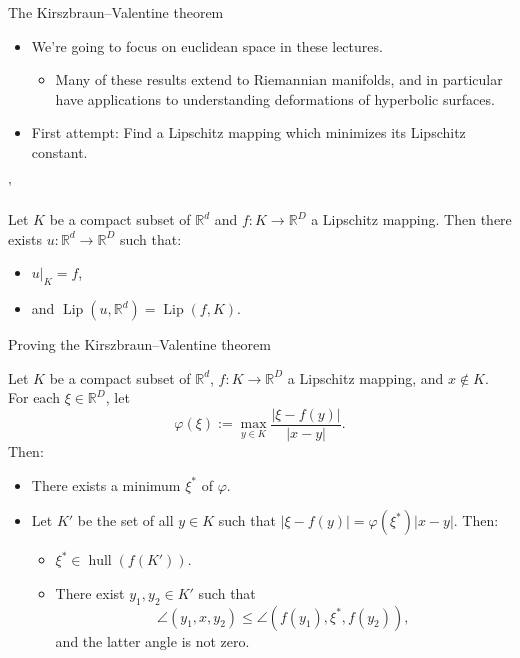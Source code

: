 \documentclass[10pt]{beamer}
\newcommand{\RR}{\mathbb{R}}
\DeclareMathOperator{\Lip}{Lip}
\DeclareMathOperator{\hull}{hull}
\begin{document}
\begin{frame}{The Kirszbraun--Valentine theorem}
\begin{itemize}
\item We're going to focus on euclidean space in these lectures.
\begin{itemize}
\item Many of these results extend to Riemannian manifolds, and in particular have applications to understanding deformations of hyperbolic surfaces. 
\end{itemize}
\item First attempt: Find a Lipschitz mapping which minimizes its Lipschitz constant. 
\end{itemize}
'
\begin{theorem}
Let $K$ be a compact subset of $\RR^d$ and $f: K \to \RR^D$ a Lipschitz mapping.
Then there exists $u: \RR^d \to \RR^D$ such that: 
\begin{itemize}
\item $u|_K = f$, 
\item and $\Lip(u, \RR^d) = \Lip(f, K)$.
\end{itemize}
\end{theorem}
\end{frame}

\begin{frame}{Proving the Kirszbraun--Valentine theorem}
\begin{lemma}
Let $K$ be a compact subset of $\RR^d$, $f: K \to \RR^D$ a Lipschitz mapping, and $x \notin K$.
For each $\xi \in \RR^D$, let 
$$\varphi(\xi) := \max_{y \in K} \frac{|\xi - f(y)|}{|x - y|}.$$
Then: 
\begin{itemize}
\item There exists a minimum $\xi^*$ of $\varphi$. 
\item Let $K'$ be the set of all $y \in K$ such that $|\xi - f(y)| = \varphi(\xi^*) |x - y|$. Then: 
\begin{itemize}
\item $\xi^* \in \hull(f(K'))$. 
\item There exist $y_1, y_2 \in K'$ such that 
$$\angle(y_1, x, y_2) \leq \angle(f(y_1), \xi^*, f(y_2)),$$
and the latter angle is not zero.
\end{itemize}
\end{itemize}
\end{lemma}
\end{frame}
\end{document}
